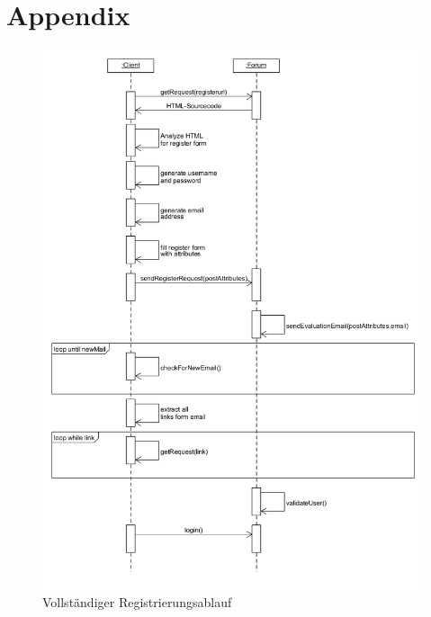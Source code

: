    	\section{Appendix}
   	
   	\begin{figure}[ht]
		\includegraphics[width=\textwidth,height=\textheight,keepaspectratio]{./diagrams/register_seq.png}
		\caption{Vollständiger Registrierungsablauf}
	\end{figure}
	
